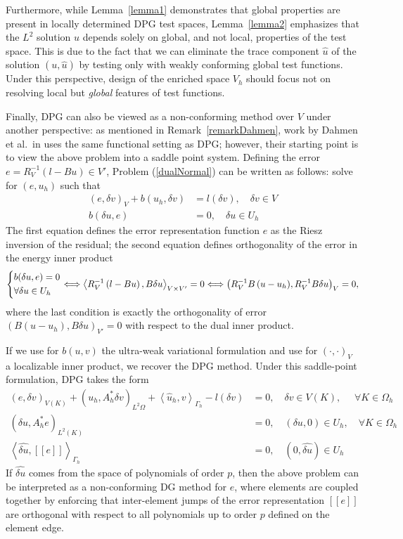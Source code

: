 \documentclass[11pt,onecolumn]{scrartcl}
\newcommand{\LRp}[1]{\left( #1 \right)}
\newcommand{\LRs}[1]{\left[ #1 \right]}
\newcommand{\LRa}[1]{\left\langle #1 \right\rangle}
\newcommand{\jump}[1] {\ensuremath{\LRs{\!\left[#1\right]\!}}}
\newcommand{\uh}{\widehat{u}}
\newcommand{\Gh}{\Gamma_h}
\newcommand{\Oh}{\Omega_h}
\begin{document}
Furthermore, while Lemma~\ref{lemma1} demonstrates that global properties are present in locally determined DPG test spaces, Lemma~\ref{lemma2} emphasizes that the $L^2$ solution $u$ depends solely on global, and not local, properties of the test space.  This is due to the fact that we can eliminate the trace component $\uh$ of the solution $\LRp{u,\uh}$ by testing only with weakly conforming global test functions.  Under this perspective, design of the enriched space $V_h$ should focus not on resolving local but \textit{global} features of test functions.  

Finally, DPG can also be viewed as a non-conforming method over $V$ under another perspective: as mentioned in Remark~\ref{remarkDahmen}, work by Dahmen et al.\ in \cite{DahmenVariationalStabilization} uses the same functional setting as DPG; however, their starting point is to view the above problem into a saddle point system.  Defining the error $e = R_V^{-1}\LRp{l-Bu} \in V'$, Problem (\ref{dualNormal}) can be written as follows: solve for $\LRp{e,u_h}$ such that
\begin{align*}
\LRp{e,\delta v}_V + b(u_h,\delta v)&= l(\delta v),\quad \delta v \in V\\
b(\delta u, e) &= 0, \quad \delta u \in U_h
\end{align*}
The first equation defines the error representation function $e$ as the Riesz inversion of the residual; the second equation defines orthogonality of the error in the energy inner product 
\[
\begin{dcases}
b(\delta u, e) = 0\\
\forall \delta u \in U_h 
\end{dcases}
\Longleftrightarrow \LRa{R_V^{-1}\LRp{l-Bu},B\delta u}_{V\times V'} = 0 \Longleftrightarrow \LRp{R_V^{-1}{B\LRp{u-u_h}},R_V^{-1}B\delta u}_{V}= 0,
\]
where the last condition is exactly the orthogonality of error $\LRp{B\LRp{u-u_h},B\delta u}_{V'}= 0$ with respect to the dual inner product.

If we use for $b(u,v)$ the ultra-weak variational formulation and use for $\LRp{\cdot,\cdot}_V$ a localizable inner product, we recover the DPG method.  Under this saddle-point formulation, DPG takes the form
\begin{align*}
\LRp{e,\delta v}_{V(K)} + \LRp{u_h,A^*_h\delta v}_{L^2{\Omega}} + \LRa{\uh_h,v}_{\Gh}- l(\delta v) &= 0, \quad \delta v \in V(K),\,\, \quad \forall K\in \Oh\\
\LRp{\delta u, A_h^*e}_{L^2(K)} &= 0, \quad \LRp{\delta u,0} \in U_h, \quad \forall K\in \Oh\\
\LRa{\widehat{\delta u}, \jump{e}}_{\Gh} &= 0, \quad \LRp{0,\widehat{\delta u}} \in U_h
\end{align*}
If $\widehat{\delta u}$ comes from the space of polynomials of order $p$, then the above problem can be interpreted as a non-conforming DG method for $e$, where elements are coupled together by enforcing that inter-element jumps of the error representation $\jump{e}$ are orthogonal with respect to all polynomials up to order $p$ defined on the element edge.  
\end{document}
